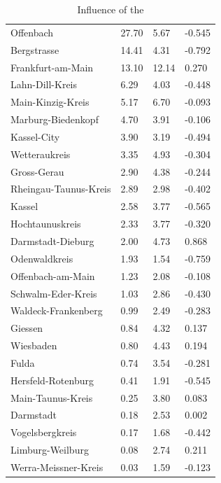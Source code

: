 \begin{table}[h]
	\caption{Influence of the }
	\centering
	\begin{tabular}{|l|x{2cm}|x{2cm}|x{2cm}|}
		\hline
		 &  &  &  \\ \hline \hline
		Offenbach & 27.70 & 5.67 & -0.545 \\ \hline
		Bergstrasse & 14.41 & 4.31 & -0.792 \\ \hline
		Frankfurt-am-Main & 13.10 & 12.14 & 0.270 \\ \hline
		Lahn-Dill-Kreis & 6.29 & 4.03 & -0.448 \\ \hline
		Main-Kinzig-Kreis & 5.17 & 6.70 & -0.093 \\ \hline
		Marburg-Biedenkopf & 4.70 & 3.91 & -0.106 \\ \hline
		Kassel-City & 3.90 & 3.19 & -0.494 \\ \hline
		Wetteraukreis & 3.35 & 4.93 & -0.304 \\ \hline
		Gross-Gerau & 2.90 & 4.38 & -0.244 \\ \hline
		Rheingau-Taunus-Kreis & 2.89 & 2.98 & -0.402 \\ \hline
		Kassel & 2.58 & 3.77 & -0.565 \\ \hline
		Hochtaunuskreis & 2.33 & 3.77 & -0.320 \\ \hline
		Darmstadt-Dieburg & 2.00 & 4.73 & 0.868 \\ \hline
		Odenwaldkreis & 1.93 & 1.54 & -0.759 \\ \hline
		Offenbach-am-Main & 1.23 & 2.08 & -0.108 \\ \hline
		Schwalm-Eder-Kreis & 1.03 & 2.86 & -0.430 \\ \hline
		Waldeck-Frankenberg & 0.99 & 2.49 & -0.283 \\ \hline
		Giessen & 0.84 & 4.32 & 0.137 \\ \hline
		Wiesbaden & 0.80 & 4.43 & 0.194 \\ \hline
		Fulda & 0.74 & 3.54 & -0.281 \\ \hline
		Hersfeld-Rotenburg & 0.41 & 1.91 & -0.545 \\ \hline
		Main-Taunus-Kreis & 0.25 & 3.80 & 0.083 \\ \hline
		Darmstadt & 0.18 & 2.53 & 0.002 \\ \hline
		Vogelsbergkreis & 0.17 & 1.68 & -0.442 \\ \hline
		Limburg-Weilburg & 0.08 & 2.74 & 0.211 \\ \hline
		Werra-Meissner-Kreis & 0.03 & 1.59 & -0.123 \\ \hline
	\end{tabular}
	\label{tab:perc_region_loss}
\end{table}


